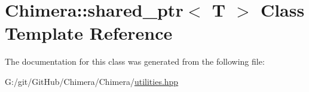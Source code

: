 \hypertarget{class_chimera_1_1shared__ptr}{}\section{Chimera\+:\+:shared\+\_\+ptr$<$ T $>$ Class Template Reference}
\label{class_chimera_1_1shared__ptr}


The documentation for this class was generated from the following file\+:\begin{DoxyCompactItemize}
\item 
G\+:/git/\+Git\+Hub/\+Chimera/\+Chimera/\mbox{\hyperlink{utilities_8hpp}{utilities.\+hpp}}\end{DoxyCompactItemize}
